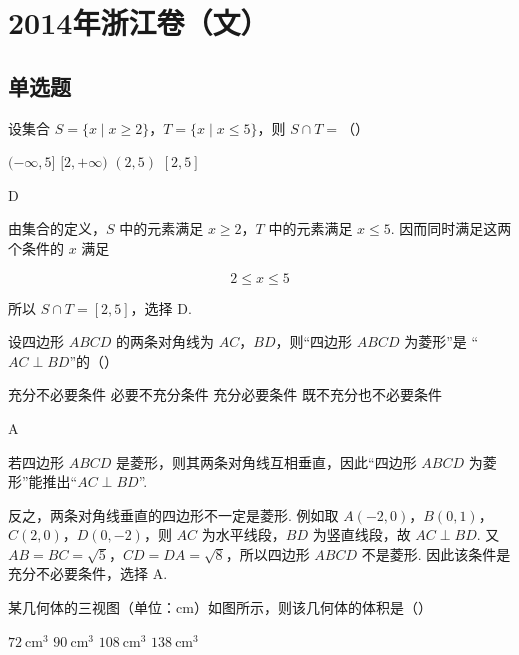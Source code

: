 \chapter{2014年浙江卷（文）}

\section{单选题}

\begin{problem}
设集合 \( S = \{x \mid x \geqslant 2\} \)，\( T = \{x \mid x \leqslant 5\} \)，则 \( S \cap T = \)（\quad）

\choices
    {\((- \infty, 5]\)}
    {\([2, +\infty)\)}
    {\((2,5)\)}
    {\([2,5]\)}
\end{problem}

\begin{answer}
D
\end{answer}

\begin{solution}
由集合的定义，\(S\) 中的元素满足 \(x\geqslant2\)，\(T\) 中的元素满足 \(x\leqslant5\). 因而同时满足这两个条件的 \(x\) 满足

\[
2\leqslant x\leqslant5
\]

所以 \(S\cap T=[2,5]\)，选择 D.
\end{solution}

\begin{problem}
设四边形 \(ABCD\) 的两条对角线为 \(AC\)，\(BD\)，则“四边形 \(ABCD\) 为菱形”是 “\(AC \perp BD\)”的（\quad）

\choices
    {充分不必要条件}
    {必要不充分条件}
    {充分必要条件}
    {既不充分也不必要条件}
\end{problem}

\begin{answer}
A
\end{answer}

\begin{solution}
若四边形 \(ABCD\) 是菱形，则其两条对角线互相垂直，因此“四边形 \(ABCD\) 为菱形”能推出“\(AC\perp BD\)”.

反之，两条对角线垂直的四边形不一定是菱形. 例如取
\(A(-2,0)\)，\(B(0,1)\)，\(C(2,0)\)，\(D(0,-2)\)，则 \(AC\) 为水平线段，\(BD\) 为竖直线段，故 \(AC\perp BD\). 又 \(AB=BC=\sqrt{5}\)，\(CD=DA=\sqrt{8}\)，所以四边形 \(ABCD\) 不是菱形. 因此该条件是充分不必要条件，选择 A.
\end{solution}

\begin{problem}
某几何体的三视图（单位：\(\mathrm{cm}\)）如图所示，则该几何体的体积是（\quad）


\choices
    {\(72 \mathrm{~cm}^{3}\)}
    {\(90 \mathrm{~cm}^{3}\)}
    {\(108 \mathrm{~cm}^{3}\)}
    {\(138 \mathrm{~cm}^{3}\)}
\end{problem}

